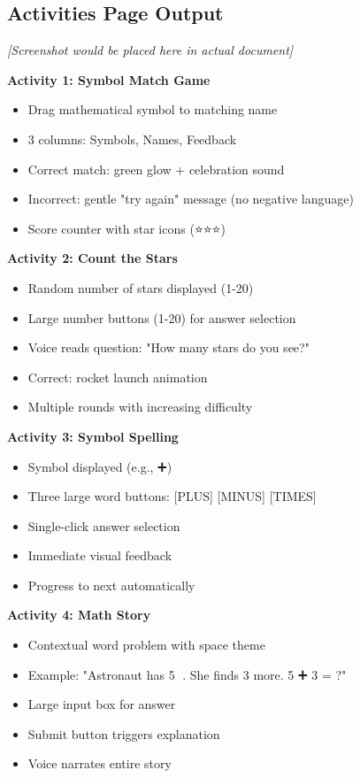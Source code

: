 \documentclass[12pt, a4paper]{article}
\begin{document}
\subsection{Activities Page Output}

\begin{tcolorbox}[colback=gray!5, colframe=gray!50, title=\textbf{Interactive Activities Interface}]
\textit{[Screenshot would be placed here in actual document]}

\textbf{Activity 1: Symbol Match Game}
\begin{itemize}
    \item Drag mathematical symbol to matching name
    \item 3 columns: Symbols, Names, Feedback
    \item Correct match: green glow + celebration sound
    \item Incorrect: gentle "try again" message (no negative language)
    \item Score counter with star icons (⭐⭐⭐)
\end{itemize}

\textbf{Activity 2: Count the Stars}
\begin{itemize}
    \item Random number of stars displayed (1-20)
    \item Large number buttons (1-20) for answer selection
    \item Voice reads question: "How many stars do you see?"
    \item Correct: rocket launch animation
    \item Multiple rounds with increasing difficulty
\end{itemize}

\textbf{Activity 3: Symbol Spelling}
\begin{itemize}
    \item Symbol displayed (e.g., ➕)
    \item Three large word buttons: [PLUS] [MINUS] [TIMES]
    \item Single-click answer selection
    \item Immediate visual feedback
    \item Progress to next automatically
\end{itemize}

\textbf{Activity 4: Math Story}
\begin{itemize}
    \item Contextual word problem with space theme
    \item Example: "Astronaut has 5 🌟. She finds 3 more. 5 ➕ 3 = ?"
    \item Large input box for answer
    \item Submit button triggers explanation
    \item Voice narrates entire story
\end{itemize}
\end{tcolorbox}
\end{document}
